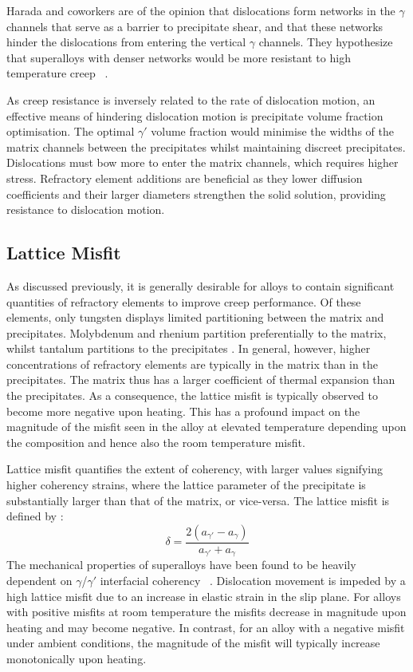 Harada and coworkers are of the opinion that dislocations form networks in the $\gamma$ channels that serve as a barrier to precipitate shear, and that these networks hinder the dislocations from entering the vertical $\gamma$ channels.  They hypothesize that superalloys with denser networks would be more resistant to high temperature creep ~\cite{harada06}.

As creep resistance is inversely related to the rate of dislocation motion, an effective means of hindering dislocation motion is precipitate volume fraction optimisation.  The optimal $\gamma'$ volume fraction would minimise the widths of the matrix channels between the precipitates whilst maintaining discreet precipitates.  Dislocations must bow more to enter the matrix channels, which requires higher stress.  Refractory element additions are beneficial as they lower diffusion coefficients and their larger diameters strengthen the solid solution, providing resistance to dislocation motion.


\subsection{Lattice Misfit}

As discussed previously, it is generally desirable for alloys to contain significant quantities of refractory elements to improve creep performance.  Of these elements, only tungsten displays limited partitioning between the matrix and precipitates. Molybdenum and rhenium partition preferentially to the matrix, whilst tantalum partitions to the precipitates \cite{reed04}. In general, however, higher concentrations of refractory elements are typically in the matrix than in the precipitates. The matrix thus has a larger coefficient of thermal expansion than the precipitates. As a consequence, the lattice misfit is typically observed to become more negative upon heating. This has a profound impact on the magnitude of the misfit seen in the alloy at elevated temperature depending upon the composition and hence also the room temperature misfit.

Lattice misfit quantifies the extent of coherency, with larger values signifying higher coherency strains, where the lattice parameter of the precipitate is substantially larger than that of the matrix, or vice-versa.  The lattice misfit is defined by \cite{nabarro96}:
%
\begin{equation}
\delta = \frac{2(a_{\gamma'} - a_\gamma)}{a_{\gamma'} + a_\gamma}
\label{eq:misfit}
\end{equation}
%
The mechanical properties of superalloys have been found to be heavily dependent on $\gamma$/$\gamma'$ interfacial coherency ~\cite{reed06}.  Dislocation movement is impeded by a high lattice misfit due to an increase in elastic strain in the slip plane.  For alloys with positive misfits at room temperature the misfits decrease in magnitude upon heating and may become negative.  In contrast, for an alloy with a negative misfit under ambient conditions, the magnitude of the misfit will typically increase monotonically upon heating.  

